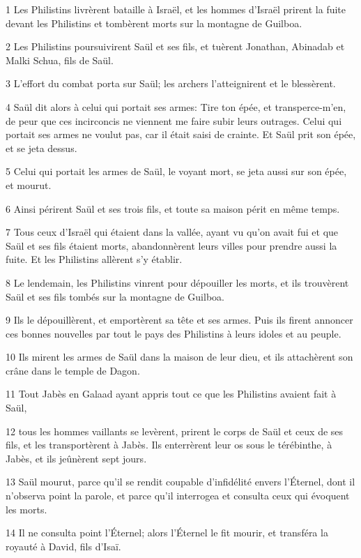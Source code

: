 \par 1 Les Philistins livrèrent bataille à Israël, et les hommes d'Israël prirent la fuite devant les Philistins et tombèrent morts sur la montagne de Guilboa.
\par 2 Les Philistins poursuivirent Saül et ses fils, et tuèrent Jonathan, Abinadab et Malki Schua, fils de Saül.
\par 3 L'effort du combat porta sur Saül; les archers l'atteignirent et le blessèrent.
\par 4 Saül dit alors à celui qui portait ses armes: Tire ton épée, et transperce-m'en, de peur que ces incirconcis ne viennent me faire subir leurs outrages. Celui qui portait ses armes ne voulut pas, car il était saisi de crainte. Et Saül prit son épée, et se jeta dessus.
\par 5 Celui qui portait les armes de Saül, le voyant mort, se jeta aussi sur son épée, et mourut.
\par 6 Ainsi périrent Saül et ses trois fils, et toute sa maison périt en même temps.
\par 7 Tous ceux d'Israël qui étaient dans la vallée, ayant vu qu'on avait fui et que Saül et ses fils étaient morts, abandonnèrent leurs villes pour prendre aussi la fuite. Et les Philistins allèrent s'y établir.
\par 8 Le lendemain, les Philistins vinrent pour dépouiller les morts, et ils trouvèrent Saül et ses fils tombés sur la montagne de Guilboa.
\par 9 Ils le dépouillèrent, et emportèrent sa tête et ses armes. Puis ils firent annoncer ces bonnes nouvelles par tout le pays des Philistins à leurs idoles et au peuple.
\par 10 Ils mirent les armes de Saül dans la maison de leur dieu, et ils attachèrent son crâne dans le temple de Dagon.
\par 11 Tout Jabès en Galaad ayant appris tout ce que les Philistins avaient fait à Saül,
\par 12 tous les hommes vaillants se levèrent, prirent le corps de Saül et ceux de ses fils, et les transportèrent à Jabès. Ils enterrèrent leur os sous le térébinthe, à Jabès, et ils jeûnèrent sept jours.
\par 13 Saül mourut, parce qu'il se rendit coupable d'infidélité envers l'Éternel, dont il n'observa point la parole, et parce qu'il interrogea et consulta ceux qui évoquent les morts.
\par 14 Il ne consulta point l'Éternel; alors l'Éternel le fit mourir, et transféra la royauté à David, fils d'Isaï.

